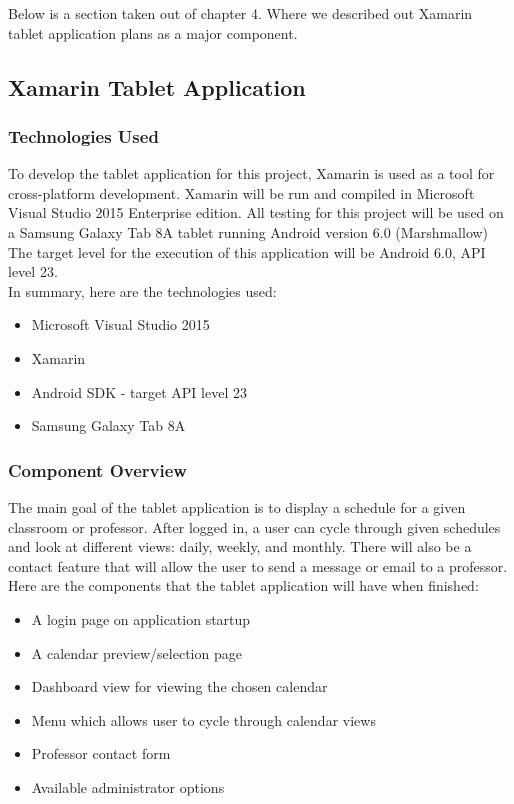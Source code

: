 \documentclass{book}
\begin{document}
Below is a section taken out of chapter 4. Where we described out Xamarin tablet application plans as a major component.
\subsection{Xamarin Tablet Application}

\subsubsection{Technologies  Used}
To develop the tablet application for this project, Xamarin is used as a tool for cross-platform development.  Xamarin will be run and compiled in Microsoft Visual Studio 2015 Enterprise edition. All testing for this project will be used on a Samsung Galaxy Tab 8A tablet running Android version 6.0 (Marshmallow) The target level for the execution of this application will be Android 6.0, API level 23.\\

In summary, here are the technologies used:

\begin{itemize}
\item Microsoft Visual Studio 2015
\item Xamarin
\item Android SDK - target API level 23
\item Samsung Galaxy Tab 8A
\end{itemize}



\subsubsection{Component  Overview}
The main goal of the tablet application is to display a schedule for a given classroom or professor. After logged in, a user can cycle through given schedules and look at different views: daily, weekly, and monthly.  There will also be a contact feature that will allow the user to send a message or email to a professor. \\

Here are the components that the tablet application will have when finished:

\begin{itemize}
\item A login page on application startup
\item A calendar preview/selection page
\item Dashboard view for viewing the chosen calendar
\item Menu which allows user to cycle through calendar views
\item Professor contact form
\item Available administrator options
\end{itemize}
\end{document}

